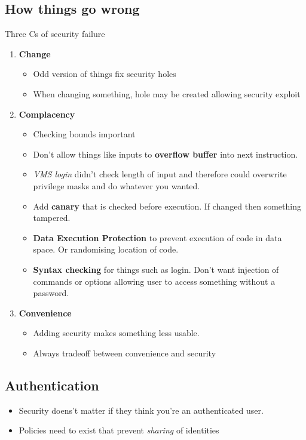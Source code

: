 \documentclass{article}
\begin{document}
	\subsection{How things go wrong}
		Three Cs of security failure
		\begin{enumerate}
			\item \textbf{Change}
			\begin{itemize}
				\item Odd version of things fix security holes
				\item When changing something, hole may be created allowing security exploit
			\end{itemize}
			
			\item \textbf{Complacency}
			\begin{itemize}
				\item Checking bounds important
				\item Don't allow things like inputs to \textbf{overflow buffer} into next instruction.
				\item \textit{VMS login} didn't check length of input and therefore could overwrite privilege masks and do whatever you wanted.
				\item Add \textbf{canary} that is checked before execution. If changed then something tampered.
				\item \textbf{Data Execution Protection} to prevent execution of code in data space. Or randomising location of code.
				\item \textbf{Syntax checking} for things such as login. Don't want injection of commands or options allowing user to access something without a password.
			\end{itemize}
			
			\item \textbf{Convenience}
			\begin{itemize}
				\item Adding security makes something less usable.
				\item Always tradeoff between convenience and security
			\end{itemize}
		\end{enumerate}
		
	\subsection{Authentication}
		\begin{itemize}
			\item Security doens't matter if they think you're an authenticated user.
			\item Policies need to exist that prevent \textit{sharing} of identities
		\end{itemize}
		
\end{document}
